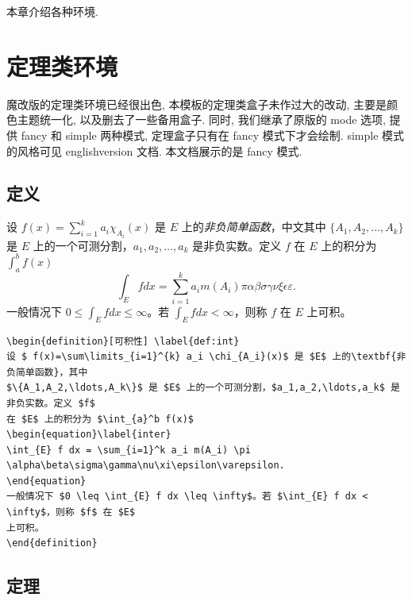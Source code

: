 \documentclass[../book.tex]{subfiles}
\begin{document}

本章介绍各种环境.

\lace

\section{定理类环境}

魔改版的定理类环境已经很出色, 本模板的定理类盒子未作过大的改动, 主要是颜色主题统一化, 以及删去了一些备用盒子. 同时, 我们继承了原版的 mode 选项, 提供 fancy 和 simple 两种模式, 定理盒子只有在 fancy 模式下才会绘制. simple 模式的风格可见 englishversion 文档. 本文档展示的是 fancy 模式.

    \subsection{定义}

\begin{definition}[可积性] \label{def:int}
设 $ f(x)=\sum_{i=1}^{k} a_i \chi_{A_i}(x)$ 是 $E$ 上的\emph{非负简单函数}，中文其中
$\{A_1,A_2,\ldots,A_k\}$ 是 $E$ 上的一个可测分割，$a_1,a_2,\ldots,a_k$ 是非负实数。定义 $f$
在 $E$ 上的积分为 $\int_a^b f(x)$
\begin{equation}\label{inter}
\int_{E} f dx = \sum_{i=1}^k a_i m(A_i) \pi \alpha\beta\sigma\gamma\nu\xi\epsilon\varepsilon.
\end{equation}
一般情况下 $0 \leq \int_{E} f dx \leq \infty$。若 $\int_{E} f dx < \infty$，则称 $f$ 在 $E$
上可积。
\end{definition}

\begin{lstlisting}
\begin{definition}[可积性] \label{def:int}
设 $ f(x)=\sum\limits_{i=1}^{k} a_i \chi_{A_i}(x)$ 是 $E$ 上的\textbf{非负简单函数}，其中
$\{A_1,A_2,\ldots,A_k\}$ 是 $E$ 上的一个可测分割，$a_1,a_2,\ldots,a_k$ 是非负实数。定义 $f$
在 $E$ 上的积分为 $\int_{a}^b f(x)$
\begin{equation}\label{inter}
\int_{E} f dx = \sum_{i=1}^k a_i m(A_i) \pi \alpha\beta\sigma\gamma\nu\xi\epsilon\varepsilon.
\end{equation}
一般情况下 $0 \leq \int_{E} f dx \leq \infty$。若 $\int_{E} f dx < \infty$，则称 $f$ 在 $E$
上可积。
\end{definition}
\end{lstlisting}

    \subsection{定理}
\end{document}
